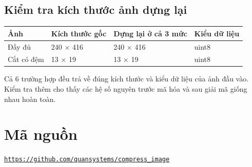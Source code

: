 \subsection{Kiểm tra kích thước ảnh dựng lại}
\begin{center}
\small\renewcommand{\arraystretch}{1.3}
\begin{tabular}{|p{3.30cm}|p{3.30cm}|p{3.30cm}|p{3.30cm}|}\hline
\textbf{Ảnh} & \textbf{Kích thước gốc} & \textbf{Dựng lại ở cả 3 mức} & \textbf{Kiểu dữ liệu} \\ \hline
Đầy đủ & 240 × 416 & 240 × 416 & uint8 \\ \hline
Cắt có đệm & 13 × 19 & 13 × 19 & uint8 \\ \hline
\end{tabular}
\end{center}
Cả 6 trường hợp đều trả về đúng kích thước và kiểu dữ liệu của ảnh đầu vào. Kiểm tra thêm cho thấy các hệ số nguyên trước mã hóa và sau giải mã giống nhau hoàn toàn.

\section{Mã nguồn}
\noindent\href{https://github.com/quansystems/compress_image}{\nolinkurl{https://github.com/quansystems/compress_image}}\par
